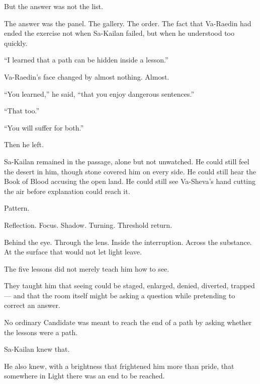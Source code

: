 But the answer was not the list.\par

The answer was the panel.
The gallery.
The order.
The fact that Va-Raedin had ended the exercise not when Sa-Kailan failed, but when he understood too quickly.\par

“I learned that a path can be hidden inside a lesson.”\par

Va-Raedin’s face changed by almost nothing.
Almost.\par

“You learned,” he said, “that you enjoy dangerous sentences.”\par

“That too.”\par

“You will suffer for both.”\par

Then he left.\par

Sa-Kailan remained in the passage, alone but not unwatched.
He could still feel the desert in him, though stone covered him on every side.
He could still hear the Book of Blood accusing the open land.
He could still see Va-Sheva’s hand cutting the air before explanation could reach it.\par

Pattern.\par

Reflection.
Focus.
Shadow.
Turning.
Threshold return.\par

Behind the eye.
Through the lens.
Inside the interruption.
Across the substance.
At the surface that would not let light leave.\par

The five lessons did not merely teach him how to see.\par

They taught him that seeing could be staged, enlarged, denied, diverted, trapped — and that the room itself might be asking a question while pretending to correct an answer.\par

No ordinary Candidate was meant to reach the end of a path by asking whether the lessons were a path.\par

Sa-Kailan knew that.\par

He also knew, with a brightness that frightened him more than pride, that somewhere in Light there was an end to be reached.\par

\ornament
